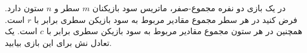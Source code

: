 در یک بازی دو نفره مجموع-صفر، ماتریس سود بازیکنان
$m$
سطر و 
$n$
ستون دارد. فرض کنید در هر سطر مجموع مقادیر مربوط به سود بازیکن سطری برابر با
$r$
است. همچنین در هر ستون مجموع مقادیر مربوط به سود بازیکن سطری برابر با
$c$
است. یک تعادل نش برای این بازی بیابید.